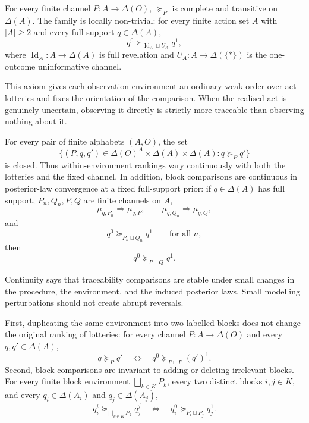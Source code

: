 \documentclass[11pt,a4paper]{article}
\theoremstyle{definition}
\newcommand{\Id}{\operatorname{Id}}
\newcommand{\1}{\mathbf 1}
\begin{document}
\begin{description}[leftmargin=*,style=sameline]

\item[(A1) Weak order and local non-triviality.]
For every finite channel $P:A\to\Delta(O)$, $\succeq_P$ is complete and transitive on $\Delta(A)$.  The family is
locally non-trivial: for every finite action set $A$ with $|A|\ge 2$ and every full-support $q\in\Delta(A)$,
\[
q^0\succ_{\Id_A\sqcup U_A}q^1,
\]
where $\Id_A:A\to\Delta(A)$ is full revelation and $U_A:A\to\Delta(\{\ast\})$ is the one-outcome uninformative channel.

This axiom gives each observation environment an ordinary weak order over act lotteries and fixes the orientation of the
comparison.  When the realised act is genuinely uncertain, observing it directly is strictly more traceable than observing
nothing about it.

\item[(A2) Continuity.]
For every pair of finite alphabets $(A,O)$, the set
\[
\{(P,q,q')\in \Delta(O)^A\times\Delta(A)\times\Delta(A):q\succeq_P q'\}
\]
is closed.  Thus within-environment rankings vary continuously with both the lotteries and the fixed channel.
In addition, block comparisons are continuous in posterior-law convergence at a fixed full-support prior: if
$q\in\Delta(A)$ has full support, $P_n,Q_n,P,Q$ are finite channels on $A$,
\[
\mu_{q,P_n}\Rightarrow \mu_{q,P},
\qquad
\mu_{q,Q_n}\Rightarrow \mu_{q,Q},
\]
and
\[
q^0\succeq_{P_n\sqcup Q_n}q^1
\qquad\text{for all }n,
\]
then
\[
q^0\succeq_{P\sqcup Q}q^1.
\]

Continuity says that traceability comparisons are stable under small changes in the procedure, the environment, and the
induced posterior laws.  Small modelling perturbations should not create abrupt reversals.

\item[(A3) Block-comparison coherence.]
First, duplicating the same environment into two labelled blocks does not change the original ranking of lotteries:
for every channel $P:A\to\Delta(O)$ and every $q,q'\in\Delta(A)$,
\[
q\succeq_P q'
\quad\Longleftrightarrow\quad
q^0\succeq_{P\sqcup P}(q')^1.
\]
Second, block comparisons are invariant to adding or deleting irrelevant blocks.  For every finite block environment
$\bigsqcup_{k\in K}P_k$, every two distinct blocks $i,j\in K$, and every
$q_i\in\Delta(A_i)$ and $q_j\in\Delta(A_j)$,
\[
q_i^i\succeq_{\bigsqcup_{k\in K}P_k}q_j^j
\quad\Longleftrightarrow\quad
q_i^0\succeq_{P_i\sqcup P_j}q_j^1.
\]


\end{description}
\end{document}
